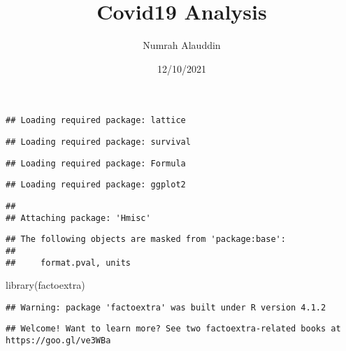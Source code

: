 \documentclass[
]{article}
\title{Covid19 Analysis}
\author{Numrah Alauddin}
\date{12/10/2021}
\newenvironment{Shaded}{\begin{snugshade}}{\end{snugshade}}
\newcommand{\AttributeTok}[1]{\textcolor[rgb]{0.77,0.63,0.00}{#1}}
\newcommand{\ConstantTok}[1]{\textcolor[rgb]{0.00,0.00,0.00}{#1}}
\newcommand{\FunctionTok}[1]{\textcolor[rgb]{0.00,0.00,0.00}{#1}}
\newcommand{\NormalTok}[1]{#1}
\newcommand{\SpecialCharTok}[1]{\textcolor[rgb]{0.00,0.00,0.00}{#1}}
\begin{document}
\maketitle

\begin{Shaded}
\end{Shaded}

\begin{verbatim}
## Loading required package: lattice
\end{verbatim}

\begin{verbatim}
## Loading required package: survival
\end{verbatim}

\begin{verbatim}
## Loading required package: Formula
\end{verbatim}

\begin{verbatim}
## Loading required package: ggplot2
\end{verbatim}

\begin{verbatim}
## 
## Attaching package: 'Hmisc'
\end{verbatim}

\begin{verbatim}
## The following objects are masked from 'package:base':
## 
##     format.pval, units
\end{verbatim}

\begin{Shaded}
\begin{Highlighting}[]
\FunctionTok{library}\NormalTok{(factoextra)}
\end{Highlighting}
\end{Shaded}

\begin{verbatim}
## Warning: package 'factoextra' was built under R version 4.1.2
\end{verbatim}

\begin{verbatim}
## Welcome! Want to learn more? See two factoextra-related books at https://goo.gl/ve3WBa
\end{verbatim}
\end{document}
